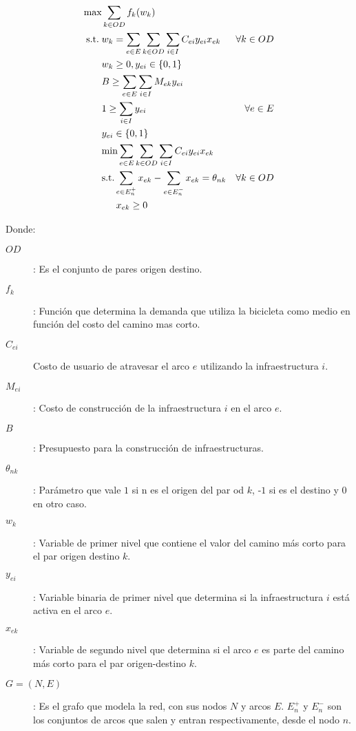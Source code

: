 \documentclass{article}
\begin{document}
  \begin{align}
    \text{max}    & \sum_{k \in OD} f_k(w_k)                                                         & \label{eq:objective1lvl} \\
    \text{s.t.}\; & w_k = \sum_{e \in E} \sum_{k \in OD} \sum_{i \in I} C_{ei}y_{ei}x_{ek}           & \forall k \in OD \label{eq:shortestpath} \\
                  & w_k \geq 0, y_{ei} \in \left\{ 0, 1 \right\}                                     & \nonumber \\
                  & B \geq \sum_{e \in E} \sum_{i \in I} M_{ek}y_{ei}                                & \label{eq:respectbudget} \\
                  & 1 \geq \sum_{i \in I} y_{ei}                                                     & \forall e \in E \label{eq:atmostoney} \\
                  & y_{ei} \in \left\{0, 1\right\}                                                   & \nonumber \\
                  & \text{min} \sum_{e \in E} \sum_{k \in OD} \sum_{i \in I} C_{ei}y_{ei}x_{ek}      & \label{eq:subproblem} \\
                  & \text{s.t.} \sum_{e \in E_n^+} x_{ek} - \sum_{e \in E_n^-} x_{ek} = \theta_{nk}  & \forall k \in OD \label {eq:flowbalance} \\
                  & \hspace{1.5em} x_{ek} \geq 0  & \nonumber
  \end{align}

  Donde:

  \begin{description}
    \item[$OD$]: Es el conjunto de pares origen destino.
    \item[$f_k$]: Función que determina la demanda que utiliza la bicicleta como medio en función del costo del camino mas corto.
    \item[$C_{ei}$] Costo de usuario de atravesar el arco $e$ utilizando la infraestructura $i$.
    \item[$M_{ei}$]: Costo de construcción de la infraestructura $i$ en el arco $e$.
    \item[$B$]: Presupuesto para la construcción de infraestructuras.
    \item[$\theta_{nk}$]: Parámetro que vale $1$ si n es el origen del par od $k$, -$1$ si es el destino y $0$ en otro caso.
    \item[$w_k$]: Variable de primer nivel que contiene el valor del camino más corto para el par origen destino $k$.
    \item[$y_{ei}$]: Variable binaria de primer nivel que determina si la infraestructura $i$ está activa en el arco $e$.
    \item[$x_{ek}$]: Variable de segundo nivel que determina si el arco $e$ es parte del camino más corto para el par origen-destino $k$.
    \item[$G=(N,E)$]: Es el grafo que modela la red, con sus nodos $N$ y arcos $E$. $E_n^+$ y $E_n^-$ son los conjuntos de arcos que salen y entran respectivamente, desde el nodo $n$.
  \end{description}
\end{document}
